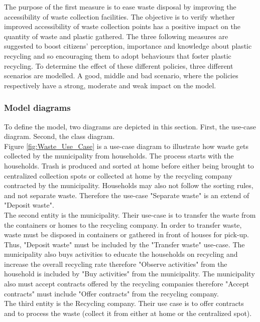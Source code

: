 \noindent The purpose of the first measure is to ease waste disposal by improving the accessibility of waste collection facilities. The objective is to verify whether improved accessibility of waste collection points has a positive impact on the quantity of waste and plastic gathered. The three following measures are suggested to boost citizens' perception, importance and knowledge about plastic recycling and so encouraging them to adopt behaviours that foster plastic recycling. To determine the effect of these different policies, three different scenarios are modelled. A good, middle and bad scenario, where the policies respectively have a strong, moderate and weak impact on the model.

\subsubsection{Model diagrams}
\noindent To define the model, two diagrams are depicted in this section. First, the use-case diagram. Second, the class diagram.\\

\noindent Figure \ref{fig:Waste_Use_Case} is a use-case diagram to illustrate how waste gets collected by the municipality from households.
The process starts with the households. Trash is produced and sorted at home before either being brought to centralized collection spots or collected at home by the recycling company contracted by the municipality. Households may also not follow the sorting rules, and not separate waste. Therefore the use-case "Separate waste" is an extend of "Deposit waste". \\

\noindent The second entity is the municipality. Their use-case is to transfer the waste from the containers or homes to the recycling company. In order to transfer waste, waste must be disposed in containers or gathered in front of houses for pick-up. Thus, "Deposit waste" must be included by the "Transfer waste" use-case. The municipality also buys activities to educate the households on recycling and increase the overall recycling rate therefore "Observe activities" from the household is included by "Buy activities" from the municipality. The municipality also must accept contracts offered by the recycling companies therefore "Accept contracts" must include "Offer contracts" from the recycling company. \\

 \noindent The third entity is the Recycling company. Their use case is to offer contracts and to process the waste (collect it from either at home or the centralized spot). \\

